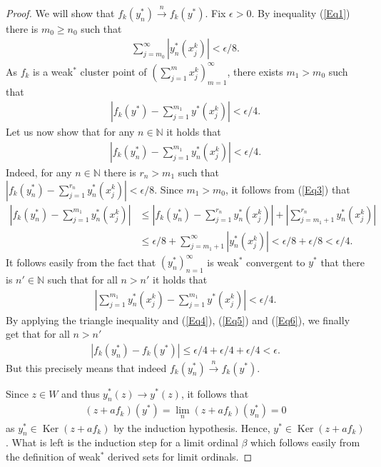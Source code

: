 \documentclass{amsart}
\theoremstyle{definition}
\begin{document}
\begin{proof}
    We will show that $f_k(y_n^*) \overset{n}{\longrightarrow} f_k(y^*)$. Fix $\epsilon > 0$. By inequality (\ref{Eq1}) there is $m_0 \geq n_0$ such that
    \begin{align} \label{Eq3}
        \sum_{j=m_0}^\infty |y_n^*(x_j^k)| < \epsilon/8.
    \end{align}
    As $f_k$ is a weak$^*$ cluster point of $\left( \sum_{j=1}^m x^k_j \right)_{m=1}^\infty$, there exists $m_1 > m_0$ such that
    \begin{align} \label{Eq4}
        |f_k(y^*) - \sum_{j=1}^{m_1} y^*(x^k_j)| < \epsilon/4.
    \end{align}
    Let us now show that for any $n \in \mathbb{N}$ it holds that
    \begin{align} \label{Eq5}
        |f_k(y_n^*) - \sum_{j=1}^{m_1} y_n^*(x^k_j)| < \epsilon/4.
    \end{align}
    Indeed, for any $n \in \mathbb{N}$ there is $r_n > m_1$ such that $|f_k(y_n^*) - \sum_{j=1}^{r_n} y_n^*(x^k_j)| < \epsilon/8$. Since $m_1 > m_0$, it follows from (\ref{Eq3}) that
    \begin{align*}
        |f_k(y_n^*) - \sum_{j=1}^{m_1} y_n^*(x^k_j)| &\leq |f_k(y_n^*) - \sum_{j=1}^{r_n} y_n^*(x^k_j)| + |\sum_{j=m_1+1}^{r_n} y_n^*(x^k_j)| \\
        &\leq \epsilon/8 + \sum_{j=m_1 + 1}^\infty |y_n^*(x^k_j)| < \epsilon/8 + \epsilon/8 < \epsilon/4.
    \end{align*}
    It follows easily from the fact that $(y_n^*)_{n=1}^\infty$ is weak$^*$ convergent to $y^*$ that there is $n' \in \mathbb{N}$ such that for all $n > n'$ it holds that
    \begin{align} \label{Eq6}
        |\sum_{j=1}^{m_1} y_n^* (x_j^k) - \sum_{j=1}^{m_1} y^* (x_j^k)| < \epsilon/4.
    \end{align}
    By applying the triangle inequality and (\ref{Eq4}), (\ref{Eq5}) and (\ref{Eq6}), we finally get that for all $n > n'$
    \begin{align*}
        |f_k(y_n^*) - f_k(y^*)| \leq \epsilon/4 + \epsilon/4 + \epsilon/4 < \epsilon.
    \end{align*}
    But this precisely means that indeed $f_k(y_n^*) \overset{n}{\longrightarrow} f_k(y^*)$.
    
    Since $z \in W$ and thus $y_n^*(z) \rightarrow y^*(z)$, it follows that
    \begin{align*}
        (z + a f_k)(y^*) = \lim_n (z + a f_k)(y_n^*) = 0
    \end{align*}
    as $y_n^* \in \operatorname{Ker}(z + a f_k)$ by the induction hypothesis. Hence, $y^* \in \operatorname{Ker}(z + a f_k)$. What is left is the induction step for a limit ordinal $\beta$ which follows easily from the definition of weak$^*$ derived sets for limit ordinals.
\end{proof}
\end{document}
